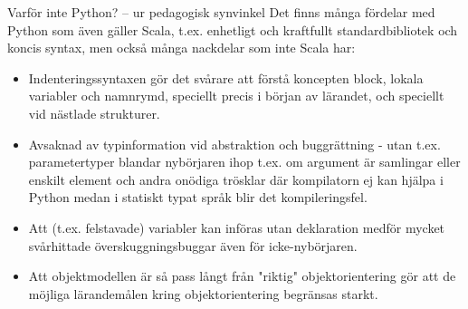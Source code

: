 \begin{Slide}{Varför inte Python? -- ur pedagogisk synvinkel}\SlideFontSmall
Det finns många fördelar med Python som även gäller Scala, t.ex. enhetligt och kraftfullt standardbibliotek och koncis syntax, men också många nackdelar som inte Scala har:
\begin{itemize}
\item Indenteringssyntaxen gör det svårare att förstå koncepten block, lokala variabler och namnrymd, speciellt precis i början av lärandet, och speciellt vid nästlade strukturer.
\item Avsaknad av typinformation vid abstraktion och buggrättning - utan t.ex. parametertyper blandar nybörjaren ihop t.ex. om argument är samlingar eller enskilt element och andra onödiga trösklar där kompilatorn ej kan hjälpa i Python medan i statiskt typat språk blir det kompileringsfel.
\item Att (t.ex. felstavade) variabler kan införas utan deklaration medför mycket svårhittade överskuggningsbuggar även för icke-nybörjaren.
\item Att objektmodellen är så pass långt från "riktig" objektorientering gör att de möjliga lärandemålen kring objektorientering begränsas starkt.
  \end{itemize}
\end{Slide}


